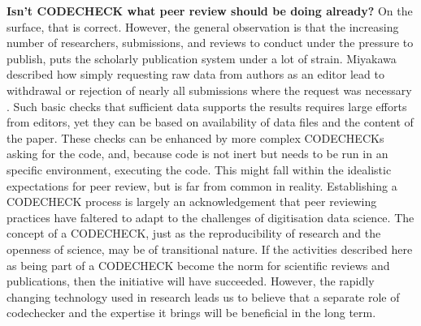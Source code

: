 \documentclass[12pt]{article}
\begin{document}
\textbf{Isn't CODECHECK what peer review should be doing already?}
On the surface, that is correct.
However, the general observation is that the
increasing number of researchers, submissions, and reviews to conduct
under the pressure to publish, puts the scholarly publication system
under a lot of strain.  
Miyakawa described how simply requesting raw data from authors as an 
editor lead to withdrawal or rejection of nearly all submissions where the
request was necessary \cite{miyakawa_no_2020}. Such basic checks that
sufficient data supports the results requires large efforts from editors,
yet they can be based on availability of data files and the content of the
paper. These checks can be enhanced by more complex CODECHECKs asking for
the code, and, because code is not inert but needs to be run in an specific
environment, executing the code.
This might fall within the idealistic expectations for peer review,
but is far from common in reality.
Establishing a CODECHECK
process is largely an acknowledgement that peer reviewing practices
have faltered to adapt to the challenges of digitisation data science.
The concept of a CODECHECK,
just as the reproducibility of research and the openness of science,
may be of transitional nature. If the activities described here as
being part of a CODECHECK become the norm for scientific reviews and
publications, then the initiative will have succeeded.  However, the
rapidly changing technology used in research leads us to believe that
a separate role of codechecker and the expertise it brings will be
beneficial in the long term.
\end{document}
